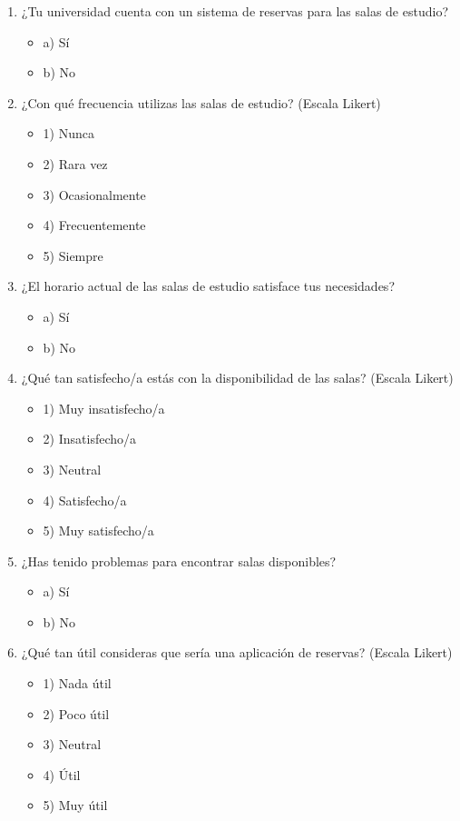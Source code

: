 \documentclass{article}
\begin{document}
\begin{multicols}{2}
  \begin{enumerate}
    \item ¿Tu universidad cuenta con un sistema de reservas para las salas de estudio? 
    \begin{itemize}[label=$\square$]
      \item a) Sí
      \item b) No
    \end{itemize}
  
    \item ¿Con qué frecuencia utilizas las salas de estudio? (Escala Likert)
    \begin{itemize}[label=$\square$]
      \item 1) Nunca
      \item 2) Rara vez
      \item 3) Ocasionalmente
      \item 4) Frecuentemente
      \item 5) Siempre
    \end{itemize}
  
    \item ¿El horario actual de las salas de estudio satisface tus necesidades? 
    \begin{itemize}[label=$\square$]
      \item a) Sí
      \item b) No
    \end{itemize}
  
    \item ¿Qué tan satisfecho/a estás con la disponibilidad de las salas? (Escala Likert)
    \begin{itemize}[label=$\square$]
      \item 1) Muy insatisfecho/a
      \item 2) Insatisfecho/a
      \item 3) Neutral
      \item 4) Satisfecho/a
      \item 5) Muy satisfecho/a
    \end{itemize}
  
    \item ¿Has tenido problemas para encontrar salas disponibles? 
    \begin{itemize}[label=$\square$]
      \item a) Sí
      \item b) No
    \end{itemize}
  
    \item ¿Qué tan útil consideras que sería una aplicación de reservas? (Escala Likert)
    \begin{itemize}[label=$\square$]
      \item 1) Nada útil
      \item 2) Poco útil
      \item 3) Neutral
      \item 4) Útil
      \item 5) Muy útil
    \end{itemize}
  \end{enumerate}  
\end{multicols}
\end{document}
